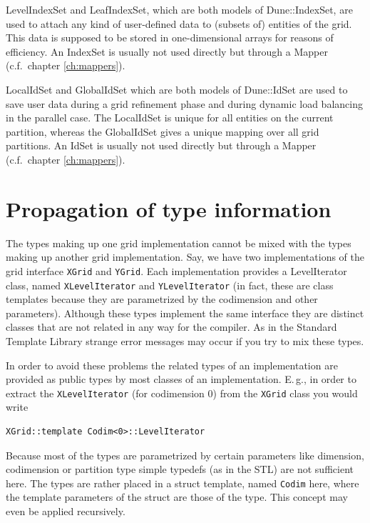 \documentclass[11pt,a4paper,headinclude,footinclude,DIV16,headings=normal]{scrreprt}
\begin{document}

    LevelIndexSet and LeafIndexSet, which are both models of
    Dune::IndexSet, are used to attach any kind of user-defined data to
    (subsets of) entities of the grid. This data is supposed to be
    stored in one-dimensional arrays for reasons of efficiency. An IndexSet is
    usually not used directly but through a Mapper (c.f.~chapter
    \ref{ch:mappers}).


    LocalIdSet and GlobalIdSet which are both models of Dune::IdSet
    are used to save user data during a grid refinement phase and
    during dynamic load balancing in the parallel case. The LocalIdSet is
    unique for all entities on the current partition, whereas the GlobalIdSet
    gives a unique mapping over all grid partitions. An IdSet is usually not used
    directly but through a Mapper (c.f.~chapter
    \ref{ch:mappers}).


\section{Propagation of type information}

The types making up one grid implementation cannot be mixed with the
types making up another grid implementation. Say, we have two
implementations of the grid interface \lstinline!XGrid! and
\lstinline!YGrid!. Each implementation provides a LevelIterator
class, named \lstinline!XLevelIterator! and
\lstinline!YLevelIterator! (in fact, these are class templates because
they are parametrized by the codimension and other
parameters). Although these types implement the same interface they
are distinct classes that are not related in any way for the
compiler. As in the Standard Template Library strange error messages
may occur if you try to mix these types.

In order to avoid these problems the related types of an
implementation are provided as public types by most classes of an
implementation. E.\,g., in order to extract the
\lstinline!XLevelIterator! (for codimension 0) from the
\lstinline!XGrid! class you would write
\begin{lstlisting}
XGrid::template Codim<0>::LevelIterator
\end{lstlisting}
Because most of the types are parametrized by certain parameters like
dimension, codimension or partition type simple typedefs (as in the
STL) are not sufficient here. The types are rather placed in a
struct template, named \lstinline!Codim! here, where the template
parameters of the struct are those of the type. This concept may even
be applied recursively.
\end{document}
